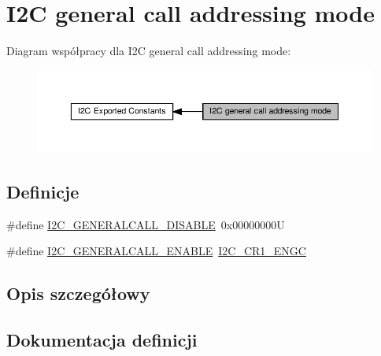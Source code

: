 \hypertarget{group___i2_c__general__call__addressing__mode}{}\section{I2C general call addressing mode}
\label{group___i2_c__general__call__addressing__mode}
Diagram współpracy dla I2C general call addressing mode\+:\nopagebreak
\begin{figure}[H]
\begin{center}
\leavevmode
\includegraphics[width=350pt]{group___i2_c__general__call__addressing__mode}
\end{center}
\end{figure}
\subsection*{Definicje}
\begin{DoxyCompactItemize}
\item 
\#define \hyperlink{group___i2_c__general__call__addressing__mode_ga14918ea7d2b23cd67c66b49ebbf5c0a8}{I2\+C\+\_\+\+G\+E\+N\+E\+R\+A\+L\+C\+A\+L\+L\+\_\+\+D\+I\+S\+A\+B\+LE}~0x00000000U
\item 
\#define \hyperlink{group___i2_c__general__call__addressing__mode_ga5ec9ec869e4c78a597c5007c245c01a0}{I2\+C\+\_\+\+G\+E\+N\+E\+R\+A\+L\+C\+A\+L\+L\+\_\+\+E\+N\+A\+B\+LE}~\hyperlink{group___peripheral___registers___bits___definition_ga1d8c219193b11f8507d7b85831d14912}{I2\+C\+\_\+\+C\+R1\+\_\+\+E\+N\+GC}
\end{DoxyCompactItemize}


\subsection{Opis szczegółowy}


\subsection{Dokumentacja definicji}
\mbox{\label{group___i2_c__general__call__addressing__mode_ga14918ea7d2b23cd67c66b49ebbf5c0a8}} 
